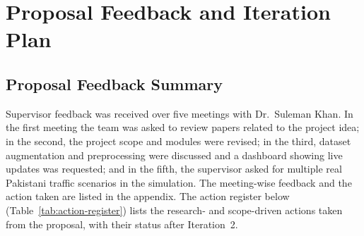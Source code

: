 \chapter{Proposal Feedback and Iteration Plan}
\label{ch:iteration-plan}

\section{Proposal Feedback Summary}
Supervisor feedback was received over five meetings with Dr.~Suleman Khan. In the first meeting the team was
asked to review papers related to the project idea; in the second, the project scope and modules were revised;
in the third, dataset augmentation and preprocessing were discussed and a dashboard showing live updates was
requested; and in the fifth, the supervisor asked for multiple real Pakistani traffic scenarios in the
simulation. The meeting-wise feedback and the action taken are listed in the appendix. The action register below
(Table~\ref{tab:action-register}) lists the research- and scope-driven actions taken from the proposal, with
their status after Iteration~2.

